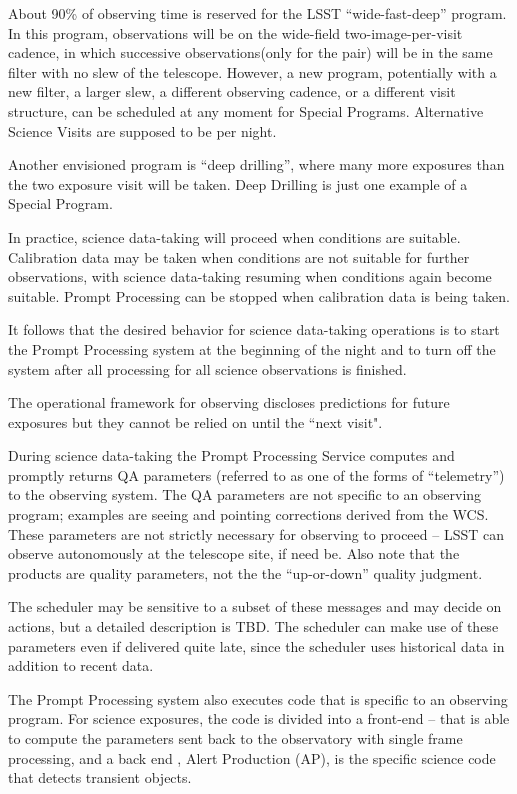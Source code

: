 About 90\% of observing time is reserved for the LSST “wide-fast-deep”
program. In this program, observations will be on the wide-field
two-image-per-visit cadence, in which successive observations(only for the pair)  will be
in the same filter with no slew of the telescope. However, a new
program, potentially with a new filter, a larger slew, a different
observing cadence, or a different visit structure, can be scheduled at
any moment for Special Programs. Alternative Science Visits are supposed to be per night.  

Another envisioned program is ``deep drilling'', where many more exposures
than the two exposure visit will be taken. Deep Drilling is just one example of a Special Program.  

In practice, science data-taking will proceed when conditions are
suitable. Calibration data may be taken when conditions are not
suitable for further observations, with science data-taking resuming
when conditions again become suitable. Prompt Processing can be stopped when calibration data is being taken.  

It follows that the desired behavior for science data-taking
operations is to start the Prompt Processing system at the beginning
of the night and to turn off the system after all processing for all
science observations is finished.

The operational framework for observing discloses predictions for future exposures but they cannot be relied on until the “next visit".

During science data-taking the Prompt Processing Service computes and
promptly returns QA parameters (referred to as one of the forms of “telemetry”) to the
observing system. The QA parameters are not specific to an observing
program; examples are seeing and pointing corrections derived from the
WCS. These parameters are not strictly necessary for observing to
proceed -- LSST can observe autonomously at the telescope site, if
need be. Also note that the products are quality parameters, not the
the “up-or-down” quality judgment.

The scheduler may be sensitive to a subset of these messages and may
decide on actions, but a detailed description is TBD. 
The scheduler can make use of these parameters even
if delivered quite late, since the scheduler uses historical data
in addition to recent data.

The Prompt Processing system also executes code that is specific to an
observing program. For science exposures, the code is divided into
a front-end -- that is able to compute the parameters sent back  to the
observatory with single frame processing, and a back end , Alert Production (AP), is the specific
science code that detects transient objects. 

